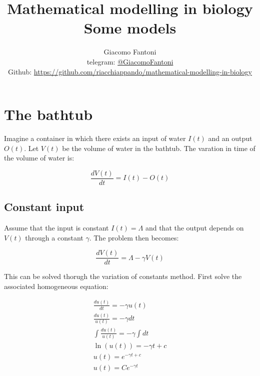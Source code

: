 

\title{\Huge\textbf{{Mathematical modelling in biology}}\\\LARGE Some models}

\author{
  Giacomo Fantoni \\
  \small telegram: \href{https://t.me/GiacomoFantoni}{@GiacomoFantoni} \\[3pt]
  \small Github: \href{https://github.com/giacThePhantom/mathematical-modelling-in-biology}{https://github.com/riacchiappando/mathematical-modelling-in-biology}\\
}




  \maketitle
  \tableofcontents

\section{The bathtub}
Imagine a container in which there exists an input of water $I(t)$ and an output $O(t)$.
Let $V(t)$ be the volume of water in the bathtub.
The varation in time of the volume of water is:

$$\frac{dV(t)}{dt} = I(t)-O(t)$$

  \subsection{Constant input}
  Assume that the input is constant $I(t) = \Lambda$ and that the output depends on $V(t)$ through a constant $\gamma$.
  The problem then becomes:

  $$\frac{dV(t)}{dt} = \Lambda - \gamma V(t)$$

  This can be solved thorugh the variation of constants method.
  First solve the associated homogeneous equation:

  \begin{align*}
    \frac{du(t)}{dt} = -\gamma u(t)\\
    \frac{du(t)}{u(t)} = -\gamma dt\\
    \int\frac{du(t)}{u(t)} = -\gamma\int dt\\
    \ln(u(t)) = -\gamma t + c\\
    u(t) = e^{-\gamma t + c}\\
    u(t) = Ce^{-\gamma t}\\
  \end{align*}

